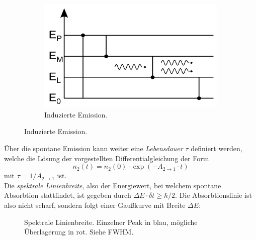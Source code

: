 \documentclass{subfiles}
\begin{document}
\begin{Antwort}
\begin{figure}[H]
\begin{subfigure}[t]{0.4\textwidth}
                \includegraphics[width=\textwidth]{Bilddateien/StimulatedEmission.png}
                \caption{Induzierte Emission.}
                \label{fig:StimulatedEmission}
            \end{subfigure}
        \end{figure}
        Über die spontane Emission kann weiter eine \emph{Lebensdauer} $\tau$ definiert werden, welche die Lösung der vorgestellten Differentialgleichung der Form 
        \[
            n_2(t) = n_2(0)\cdot \exp(-A_{2\to 1}\cdot t)
        \]
        mit $\tau = 1/A_{2\to 1}$ ist. \\

        Die \emph{spektrale Linienbreite}, also der Energiewert, bei welchem spontane Absorbtion stattfindet, ist gegeben durch $\Delta E\cdot\delta t \geq \hbar/2$. Die Absorbtionslinie ist also nicht scharf, sondern folgt einer Gaußkurve mit Breite $\Delta E$:
        \begin{figure}[H]
            \centering
            \caption{Spektrale Linienbreite. Einzelner Peak in blau, mögliche Überlagerung in rot. Siehe FWHM.}
        \end{figure}
    \end{Antwort}
\end{document}
